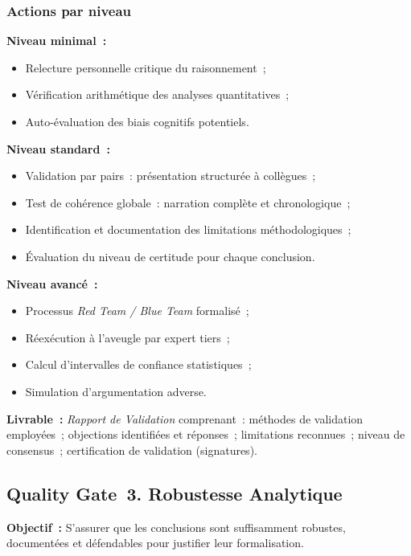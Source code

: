 \subsubsection*{Actions par niveau}

\textbf{Niveau minimal~:}
\begin{itemize}
    \item Relecture personnelle critique du raisonnement~;
    \item Vérification arithmétique des analyses quantitatives~;
    \item Auto-évaluation des biais cognitifs potentiels.
\end{itemize}

\textbf{Niveau standard~:}
\begin{itemize}
    \item Validation par pairs~: présentation structurée à collègues~;
    \item Test de cohérence globale~: narration complète et chronologique~;
    \item Identification et documentation des limitations méthodologiques~;
    \item Évaluation du niveau de certitude pour chaque conclusion.
\end{itemize}

\textbf{Niveau avancé~:}
\begin{itemize}
    \item Processus \textit{Red Team / Blue Team} formalisé~;
    \item Réexécution à l'aveugle par expert tiers~;
    \item Calcul d'intervalles de confiance statistiques~;
    \item Simulation d'argumentation adverse.
\end{itemize}

\textbf{Livrable~:} \textit{Rapport de Validation} comprenant~: méthodes de
validation employées~; objections identifiées et réponses~; limitations
reconnues~; niveau de consensus~; certification de validation (signatures).

\subsection{Quality Gate~3. Robustesse Analytique}

\textbf{Objectif~:} S'assurer que les conclusions sont suffisamment robustes,
documentées et défendables pour justifier leur formalisation.


